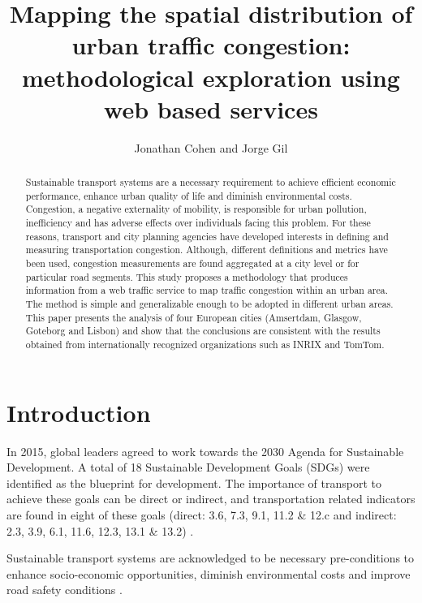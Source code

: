 \documentclass[a4paper]{jpconf}
\begin{document}
	\title{Mapping the spatial distribution of urban traffic congestion: methodological exploration using web based services }
	\author{Jonathan Cohen and Jorge Gil}
	\address{Department of Architecture and Civil Engineering, Chalmers University of Technology, Sven Hultins gata 6, SE-412 96, Göteborg, Sweden}
	
	\begin{abstract}%
		Sustainable transport systems are a necessary requirement to achieve efficient economic performance, enhance urban quality of life and diminish environmental costs. Congestion, a negative externality of mobility, is responsible for urban pollution, inefficiency and has adverse effects over individuals facing this problem. For these reasons, transport and city planning agencies have developed interests in defining and measuring transportation congestion. Although, different definitions and metrics have been used, congestion measurements are found aggregated at a city level or for particular road segments. This study proposes a methodology that produces information from a web traffic service to map traffic congestion within an urban area. The method is simple and generalizable enough to be adopted in different urban areas. This paper presents the analysis of four European cities (Amsertdam, Glasgow, Goteborg and Lisbon) and show that the conclusions are consistent with the results obtained from internationally recognized organizations such as INRIX and TomTom.
	\end{abstract}
	
	
	\section{Introduction}%
	In 2015, global leaders agreed to work towards the 2030 Agenda for Sustainable Development. A total of 18 Sustainable Development Goals (SDGs) were identified as the blueprint for development. The importance of transport to achieve these goals can be direct or indirect, and transportation related indicators are found in eight of these goals (direct: 3.6, 7.3, 9.1, 11.2 \& 12.c and indirect: 2.3, 3.9, 6.1, 11.6, 12.3, 13.1 \& 13.2) \parencite{Booth2000, UN-Habitat2015}. \par
	Sustainable transport systems are acknowledged to be necessary pre-conditions to enhance socio-economic opportunities, diminish environmental costs and improve road safety conditions \parencite{Jennings2016}.\par
	
\end{document}
